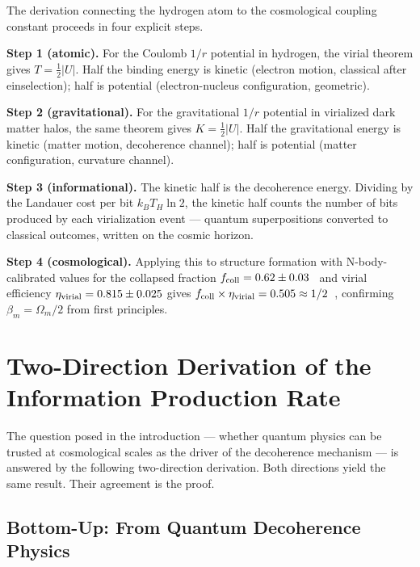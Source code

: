 \documentclass[12pt,a4paper]{article}
\begin{document}
The derivation connecting the hydrogen atom to the cosmological coupling
constant proceeds in four explicit steps.

\textbf{Step 1 (atomic).} For the Coulomb $1/r$ potential in hydrogen, the
virial theorem gives $T = \tfrac{1}{2}|U|$. Half the binding energy is kinetic
(electron motion, classical after einselection); half is potential
(electron-nucleus configuration, geometric).

\textbf{Step 2 (gravitational).} For the gravitational $1/r$ potential in
virialized dark matter halos, the same theorem gives $K = \tfrac{1}{2}|U|$.
Half the gravitational energy is kinetic (matter motion, decoherence channel);
half is potential (matter configuration, curvature channel).

\textbf{Step 3 (informational).} The kinetic half is the decoherence energy.
Dividing by the Landauer cost per bit $k_B T_H \ln 2$, the kinetic half
counts the number of bits produced by each virialization event --- quantum
superpositions converted to classical outcomes, written on the cosmic horizon.

\textbf{Step 4 (cosmological).} Applying this to structure formation with
N-body-calibrated values for the collapsed fraction $f_{\rm coll} = 0.62 \pm
0.03$~\citep{Tinker2008} and virial efficiency $\eta_{\rm virial} = 0.815 \pm
0.025$ gives $f_{\rm coll} \times \eta_{\rm virial} = 0.505 \approx 1/2$~\citep{IAM_virial},
confirming $\beta_m = \Omega_m/2$ from first principles.

\section{Two-Direction Derivation of the Information Production Rate}
\label{sec:derivation}

The question posed in the introduction --- whether quantum physics can be trusted
at cosmological scales as the driver of the decoherence mechanism --- is
answered by the following two-direction derivation. Both directions yield the
same result. Their agreement is the proof.

\subsection{Bottom-Up: From Quantum Decoherence Physics}
\end{document}
